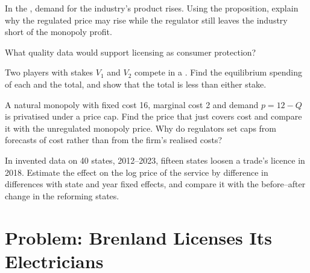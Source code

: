 \begin{exercise}[$\star\star$]\label{exo:b3:interest-groups-and-regulation:8}
In the , demand for the industry's product rises. Using the
proposition, explain why the regulated price may rise while the regulator still
leaves the industry short of the monopoly profit.
\end{exercise}

\begin{exercise}[$\star\star$]\label{exo:b3:interest-groups-and-regulation:9}
What quality data would support licensing as consumer protection?
\end{exercise}

\begin{exercise}[$\star\star\star$]\label{exo:b3:interest-groups-and-regulation:10}
Two players with stakes $V_1$ and $V_2$ compete in a . Find the equilibrium
spending of each and the total, and show that the total is less than either stake.
\end{exercise}

\begin{exercise}[$\star\star\star$]\label{exo:b3:interest-groups-and-regulation:11}
A natural monopoly with fixed cost 16, marginal cost 2 and demand $p = 12 - Q$ is
privatised under a price cap. Find the price that just covers cost and compare it
with the unregulated monopoly price. Why do regulators set caps from forecasts of
cost rather than from the firm's realised costs?
\end{exercise}

\begin{exercise}[$\star\star\star$]\label{exo:b3:interest-groups-and-regulation:12}
In invented data on 40 states, 2012--2023, fifteen states loosen a trade's licence in 2018.
Estimate the effect on the log price of the service by difference in differences
with state and year fixed effects, and compare it with the before--after change in
the reforming states.
\end{exercise}

\section{Problem: Brenland Licenses Its Electricians}\label{sec:b3:interest-groups-and-regulation:problem}

